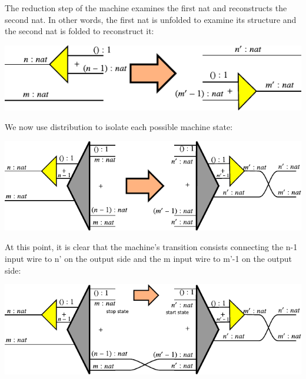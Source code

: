\documentclass{llncs}
\begin{document}
The reduction step of the machine examines the first {{nat}} and reconstructs
the second {{nat}}. In other words, the first {{nat}} is unfolded to examine
its structure and the second {{nat}} is folded to reconstruct it:

\begin{center}
  \includegraphics{diagrams/nat-nat3.pdf}
\end{center}

We now use distribution to isolate each possible machine state:


\begin{center}
  \includegraphics{diagrams/nat-nat4.pdf}
\end{center}

At this point, it is clear that the machine's transition consists connecting
the {{n-1}} input wire to {{n'}} on the output side and the {{m}} input wire
to {{m'-1}} on the output side:

\begin{center}
  \includegraphics{diagrams/nat-nat5.pdf}
\end{center}

\end{document}
